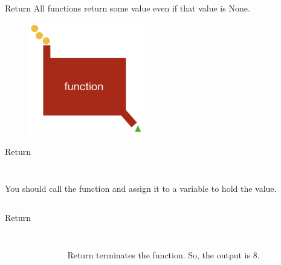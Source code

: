         \begin{frame}{Return}
        All functions return some value even if that value is None.
            \begin{figure}[H]
                \centering
                \includegraphics[width=50mm]{code-examples/function.png}
                \end{figure}
        \end{frame}

        \begin{frame}{Return}
            \begin{columns}
                \begin{column}{0.50\textwidth}
                    \inputminted[frame=single,framesep=2pt, lastline=15]{python3}{code-examples/return1.py}
                    You should call the function and assign it to a variable to hold the value.
                \end{column}
                \begin{column}{0.50\textwidth}
                    \inputminted[frame=single,framesep=2pt, lastline=15]{python3}{code-examples/return1_1.py}
                \end{column}
            \end{columns}
        \end{frame}

        \begin{frame}{Return}
            \begin{columns}
                \begin{column}{0.50\textwidth}
                    \inputminted[frame=single,framesep=2pt, lastline=15]{python3}{code-examples/return2.py}  
                \end{column}
                \begin{column}{0.50\textwidth}
                    \inputminted[frame=single,framesep=2pt, lastline=15]{python3}{code-examples/return3.py}
                    Return terminates the function. So, the output is 8.
                \end{column}
            \end{columns}
        \end{frame}


